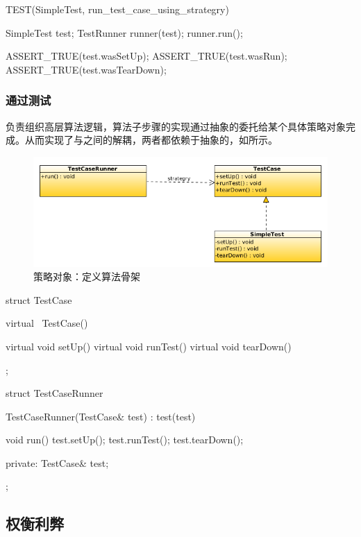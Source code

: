 \begin{content}
\begin{leftbar}
\begin{c++}
TEST(SimpleTest, run_test_case_using_strategry) {
  SimpleTest test;
  TestRunner runner(test);
  runner.run();

  ASSERT_TRUE(test.wasSetUp);
  ASSERT_TRUE(test.wasRun);
  ASSERT_TRUE(test.wasTearDown);  
}
 \end{c++}
\end{leftbar}

\subsubsection{通过测试}

负责组织高层算法逻辑，算法子步骤的实现通过抽象的委托给某个具体策略对象完成。从而实现了与之间的解耦，两者都依赖于抽象的，如所示。

\begin{figure}[H]
\centering
\includegraphics[width=1.0\textwidth]{figures/xunit/simple-test-strategry.png}
\caption{策略对象：定义算法骨架}
 \label{fig:simple-test-strategry}
\end{figure}


\begin{leftbar}
 \begin{c++}
struct TestCase {
  virtual ~TestCase() {}

  virtual void setUp() {}
  virtual void runTest() {}
  virtual void tearDown() {}
};

struct TestCaseRunner {
  TestCaseRunner(TestCase& test) : test(test) {
  }

  void run() {
    test.setUp();
    test.runTest();
    test.tearDown();
  }

private:
  TestCase& test;
};
 \end{c++}
\end{leftbar}

\subsection{权衡利弊}


\end{content}
